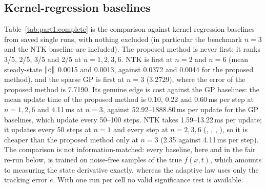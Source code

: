 \subsection{Kernel-regression baselines}

Table~\ref{tab:part1:complete} is the comparison against kernel-regression baselines from saved single runs, with
nothing excluded (in particular the benchmark $n=3$ and the NTK baseline are included). The proposed method is never
first: it ranks 3/5, 2/5, 3/5 and 2/5 at $n=1,2,3,6$. NTK is first at $n=2$ and $n=6$ (mean steady-state $\lVert e\rVert$
0.0015 and 0.0013, against 0.0372 and 0.0044 for the proposed method), and the sparse GP is first at $n=3$ (3.2729),
where the error of the proposed method is 7.7190. Its genuine edge is cost against the GP baselines: the mean update
time of the proposed method is 0.10, 0.22 and 0.60\,ms per step at $n=1,2,6$ and 4.11\,ms at $n=3$, against
52.92--1888.80\,ms per update for the GP baselines, which update every 50--100 steps. NTK takes 1.59--13.22\,ms per
update; it updates every 50 steps at $n=1$ and every step at $n=2,3,6$ (,
, , ), so it is
cheaper than the proposed method only at $n=3$ (2.35 against 4.11\,ms per step). The comparison is not
information-matched: every baseline, here and in the fair re-run below, is trained on noise-free samples of the true
$f(x,t)$, which amounts to measuring the state derivative exactly, whereas the adaptive law uses only the tracking
error $e$. With one run per cell no valid
significance test is available.

